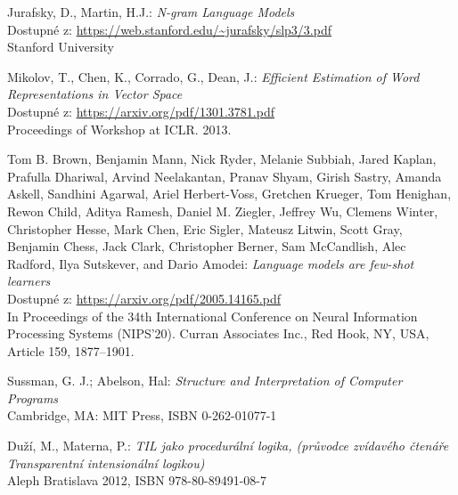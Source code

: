 \documentclass[czech,master]{diploma}
\begin{document}
\MakeTitlePages

\listoffigures
\clearpage

\listoftables
\clearpage









\renewcommand{\bibname}{Zdroje}
\begin{thebibliography}{50}

Jurafsky, D., Martin, H.J.: \textit{N-gram Language Models}\\
Dostupné z: \url{https://web.stanford.edu/~jurafsky/slp3/3.pdf}\\
Stanford University

Mikolov, T., Chen, K., Corrado, G., Dean, J.: \textit{Efficient Estimation of Word Representations in Vector Space}\\
Dostupné z: \url{https://arxiv.org/pdf/1301.3781.pdf}\\
Proceedings of Workshop at ICLR. 2013.

Tom B. Brown, Benjamin Mann, Nick Ryder, Melanie Subbiah, Jared Kaplan, Prafulla Dhariwal, Arvind Neelakantan, Pranav Shyam, Girish Sastry, Amanda Askell, Sandhini Agarwal, Ariel Herbert-Voss, Gretchen Krueger, Tom Henighan, Rewon Child, Aditya Ramesh, Daniel M. Ziegler, Jeffrey Wu, Clemens Winter, Christopher Hesse, Mark Chen, Eric Sigler, Mateusz Litwin, Scott Gray, Benjamin Chess, Jack Clark, Christopher Berner, Sam McCandlish, Alec Radford, Ilya Sutskever, and Dario Amodei: \textit{Language models are few-shot learners}\\
Dostupné z: \url{https://arxiv.org/pdf/2005.14165.pdf}\\
In Proceedings of the 34th International Conference on Neural Information Processing Systems (NIPS'20). Curran Associates Inc., Red Hook, NY, USA, Article 159, 1877–1901.

Sussman, G. J.; Abelson, Hal: \textit{Structure and Interpretation of Computer Programs} \\
Cambridge, MA: MIT Press, ISBN 0-262-01077-1

Duží, M., Materna, P.: \textit{TIL jako procedurální logika, (průvodce zvídavého čtenáře Transparentní intensionální logikou)} \\
Aleph Bratislava 2012, ISBN 978-80-89491-08-7


\end{thebibliography}
\end{document}
